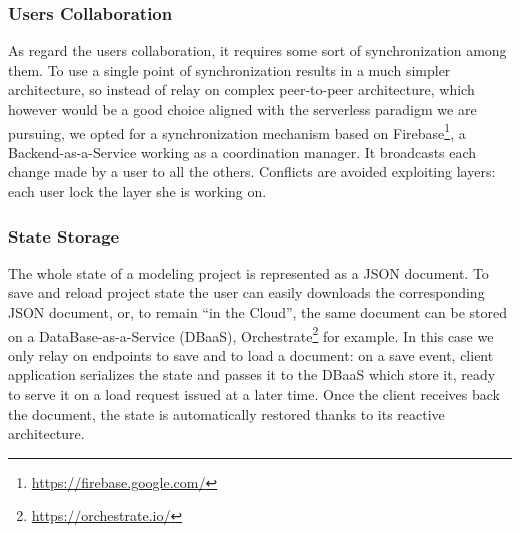 \subsubsection*{Users Collaboration}

As regard the users collaboration, it requires some sort of synchronization among them. To use a single point of synchronization results in a much simpler architecture, so instead of relay on complex peer-to-peer architecture, which however would be a good choice aligned with the serverless paradigm we are pursuing, we opted for a synchronization mechanism based on Firebase\footnote{\url{https://firebase.google.com/}}, a Backend-as-a-Service working as a coordination manager. It broadcasts each change made by a user to all the others. Conflicts are avoided exploiting layers: each user lock the layer she is working on.

\subsubsection*{State Storage}


The whole state of a modeling project is represented as a JSON document. To save and reload project state the user can easily downloads the corresponding JSON document, or, to remain ``in the Cloud'', the same document can be stored on a DataBase-as-a-Service (DBaaS), Orchestrate\footnote{\url{https://orchestrate.io/}} for example. In this case we only relay on endpoints to save and to load a document: on a save event,  client application serializes the state and passes it to the DBaaS which store it, ready to serve it on a load request issued at a later time. Once the client receives back the document, the state is automatically restored thanks to its reactive architecture.


